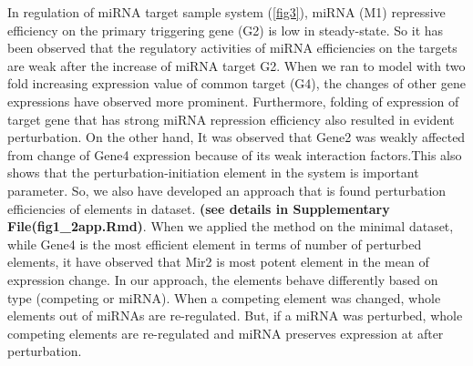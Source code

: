 \documentclass[]{article}
\begin{document}
In regulation of miRNA target sample system (\autoref{fig3}), miRNA (M1)
repressive efficiency on the primary triggering gene (G2) is low in
steady-state. So it has been observed that the regulatory activities of
miRNA efficiencies on the targets are weak after the increase of miRNA
target G2. When we ran to model with two fold increasing expression
value of common target (G4), the changes of other gene expressions have
observed more prominent. Furthermore, folding of expression of target
gene that has strong miRNA repression efficiency also resulted in
evident perturbation. On the other hand, It was observed that Gene2 was
weakly affected from change of Gene4 expression because of its weak
interaction factors.This also shows that the perturbation-initiation
element in the system is important parameter. So, we also have developed
an approach that is found perturbation efficiencies of elements in
dataset. \textbf{(see details in Supplementary File(fig1\_2app.Rmd)}.
When we applied the method on the minimal dataset, while Gene4 is the
most efficient element in terms of number of perturbed elements, it have
observed that Mir2 is most potent element in the mean of expression
change. In our approach, the elements behave differently based on type
(competing or miRNA). When a competing element was changed, whole
elements out of miRNAs are re-regulated. But, if a miRNA was perturbed,
whole competing elements are re-regulated and miRNA preserves expression
at after perturbation.
\end{document}
